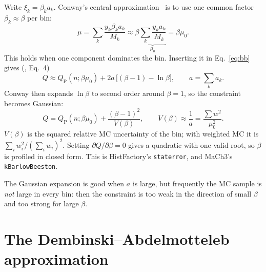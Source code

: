 \documentclass[11pt,a4paper]{article}
\newcommand{\QP}{Q_{\mathrm{P}}}
\newcommand{\code}[1]{\texttt{#1}}
\begin{document}
Write $\xi_k = \beta_k a_k$. Conway's central approximation~\cite{Conway} is to use one common
factor $\beta_k\approx\beta$ per bin:
\begin{equation}
  \mu = \sum_k \frac{y_k\beta_k a_k}{M_k} \approx \beta \underbrace{\sum_k \frac{y_k a_k}{M_k}}_{\mu_0}
  = \beta\mu_0 .
\end{equation}
This holds when one component dominates the bin. Inserting it in Eq.~\eqref{eq:bb} gives
(\cite{DA}, Eq.~4)
\begin{equation}
  Q \approx \QP(n;\beta\mu_0) + 2a\,\bigl[(\beta-1) - \ln\beta\bigr], \qquad a=\sum_k a_k .
  \label{eq:branch}
\end{equation}
Conway then expands $\ln\beta$ to second order around $\beta=1$, so the constraint becomes Gaussian:
\begin{equation}
  Q = \QP(n;\beta\mu_0) + \frac{(\beta-1)^2}{V(\beta)}, \qquad V(\beta)\approx\frac1a
  = \frac{\sum w^2}{\mu_0^2}.
  \label{eq:conway}
\end{equation}
$V(\beta)$ is the squared relative MC uncertainty of the bin; with weighted MC it is
$\sum_i w_i^2/(\sum_i w_i)^2$. Setting $\partial Q/\partial\beta=0$ gives a quadratic with one
valid root, so $\beta$ is profiled in closed form. This is HistFactory's \code{staterror}, and
MaCh3's \code{kBarlowBeeston}.

The Gaussian expansion is good when $a$ is large, but frequently the MC sample is \emph{not} large
in every bin: then the constraint is too weak in the direction of small $\beta$ and too strong
for large $\beta$.

\section{The Dembinski--Abdelmotteleb approximation}
\end{document}
